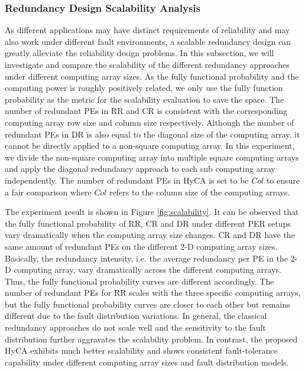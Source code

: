 \subsubsection{Redundancy Design Scalability Analysis}
As different applications may have distinct requirements of reliability and may also work under different fault environments, a scalable redundancy design can greatly alleviate the reliability design problems. In this subsection, we will investigate and compare the scalability of the different redundancy approaches under different computing array sizes. As the fully functional probability and the computing power is roughly positively related, we only use the fully function probability as the metric for the scalability evaluation to save the space. The number of redundant PEs in RR and CR is consistent with the corresponding computing array row size and column size respectively. Although the number of redundant PEs in DR is also equal to the diagonal size of the computing array, it cannot be directly applied to a non-square computing array. In this experiment, we divide the non-square computing array into multiple square computing arrays and apply the diagonal redundancy approach to each sub computing array independently. The number of redundant PEs in HyCA is set to be $Col$ to ensure a fair comparison where $Col$ refers to the column size of the computing arrays. 

The experiment result is shown in Figure \ref{fig:scalability}. It can be observed that the fully functional probability of RR, CR and DR under different PER setups vary dramatically when the computing array size changes. CR and DR have the same amount of redundant PEs on the different 2-D computing array sizes. Basically, the redundancy intensity, i.e. the average redundancy per PE in the 2-D computing array, vary dramatically across the different computing arrays. Thus, the fully functional probability curves are different accordingly. The number of redundant PEs for RR scales with the three specific computing arrays, but the fully functional probability curves are closer to each other but remains different due to the fault distribution variations. In general, the classical redundancy approaches do not scale well and the sensitivity to the fault distribution further aggravates the scalability problem. In contrast, the proposed HyCA exhibits much better scalability and shows consistent fault-tolerance capability under different computing array sizes and fault distribution models.

